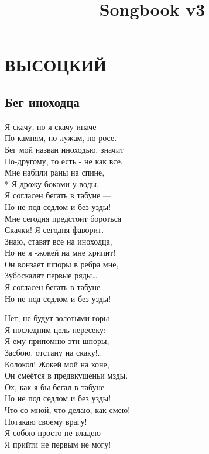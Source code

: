 \documentclass{memoir}
\title{Songbook v3}
\begin{document}
\tableofcontents
\chapter*{ВЫСОЦКИЙ}
\clearpage

{\huge
\section*{Бег иноходца}

}
\begin{multicols}{2}
\noindent
{\huge
Я скачу, но я скачу иначе\\
По камням, по лужам, по росе.\\
Бег мой назван иноходью, значит\\
По-другому, то есть - не как все.\\

\noindent
Мне набили раны на спине,\\*
Я дрожу боками у воды.\\
Я согласен бегать в табуне —\\
Но не под седлом и без узды!\\

\noindent
Мне сегодня предстоит бороться \\
Скачки! Я сегодня фаворит.\\
Знаю, ставят все на иноходца,\\
Но не я -жокей на мне хрипит!\\

\noindent
Он вонзает шпоры в ребра мне,\\
Зубоскалят первые ряды…\\
Я согласен бегать в табуне —\\
Но не под седлом и без узды!
 
\columnbreak  

\noindent
Нет, не будут золотыми горы \\
Я последним цель пересеку:\\
Я ему припомню эти шпоры,\\
Засбою, отстану на скаку!..\\

\noindent
Колокол! Жокей мой на коне,\\
Он смеётся в предвкушеньи мзды.\\
Ох, как я бы бегал в табуне \\
Но не под седлом и без узды!\\

\noindent
Что со мной, что делаю, как смею!\\
Потакаю своему врагу!\\
Я собою просто не владею —\\
Я прийти не первым не могу!\\

}
\end{multicols}
\end{document}
